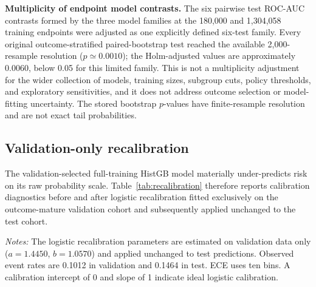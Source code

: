 \documentclass[10pt]{article}
\begin{document}
\noindent\textbf{Multiplicity of endpoint model contrasts.} The six pairwise test ROC-AUC contrasts formed by the three model families at the 180,000 and 1,304,058 training endpoints were adjusted as one explicitly defined six-test family. Every original outcome-stratified paired-bootstrap test reached the available 2,000-resample resolution ($p\simeq0.0010$); the Holm-adjusted values are approximately 0.0060, below 0.05 for this limited family. This is not a multiplicity adjustment for the wider collection of models, training sizes, subgroup cuts, policy thresholds, and exploratory sensitivities, and it does not address outcome selection or model-fitting uncertainty. The stored bootstrap $p$-values have finite-resample resolution and are not exact tail probabilities.


\subsection{Validation-only recalibration}

\label{sec:recalibration}

The validation-selected full-training HistGB model materially under-predicts risk on its raw probability scale. Table~\ref{tab:recalibration} therefore reports calibration diagnostics before and after logistic recalibration fitted exclusively on the outcome-mature validation cohort and subsequently applied unchanged to the test cohort.

\begin{table}[!ht]
\centering
\caption{Calibration diagnostics before and after validation-only logistic recalibration of the selected HistGB estimator.}
\label{tab:recalibration}

\vspace{3pt}
{\footnotesize \textit{Notes:} The logistic recalibration parameters are estimated on validation data only ($a=1.4450$, $b=1.0570$) and applied unchanged to test predictions. Observed event rates are 0.1012 in validation and 0.1464 in test. ECE uses ten bins. A calibration intercept of 0 and slope of 1 indicate ideal logistic calibration.}
\end{table}
\end{document}
